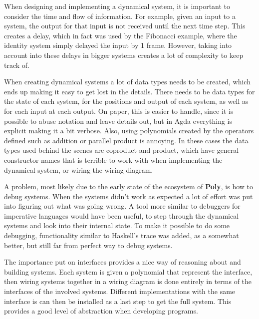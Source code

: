 When designing and implementing a dynamical system, it is important to consider the time and flow of information. For example, given an input to a system, the output for that input is not received until the next time step. This creates a delay, which in fact was used by the Fibonacci example, where the identity system simply delayed the input by 1 frame. However, taking into account into these delays in bigger systems creates a lot of complexity to keep track of. 


When creating dynamical systems a lot of data types needs to be created, which ends up making it easy to get lost in the details. There needs to be data types for the state of each system, for the positions and output of each system, as well as for each input at each output. On paper, this is easier to handle, since it is possible to abuse notation and leave details out, but in Agda everything is explicit making it a bit verbose. Also, using polynomials created by the operators defined such as addition or parallel product is annoying. In these cases the data types used behind the scenes are coproduct and product, which have general constructor names that is terrible to work with when implementing the dynamical system, or wiring the wiring diagram. 

A problem, most likely due to the early state of the ecosystem of \textbf{Poly}, is how to debug systems. When the systems didn't work as expected a lot of effort was put into figuring out what was going wrong. A tool more similar to debuggers for imperative languages would have been useful, to step through the dynamical systems and look into their internal state. To make it possible to do some debugging, functionality similar to Haskell's trace was added, as a somewhat better, but still far from perfect way to debug systems.

The importance put on interfaces provides a nice way of reasoning about and building systems. Each system is given a polynomial that represent the interface, then wiring systems together in a wiring diagram is done entirely in terms of the interfaces of the involved systems. Different implementations with the same interface is can then be installed as a last step to get the full system. This provides a good level of abstraction when developing programs.

